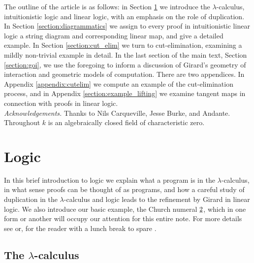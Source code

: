 \documentclass[english,letter paper,12pt,reqno]{article}
\theoremstyle{example}
\numberwithin{equation}{section}
\begin{document}
The outline of the article is as follows: in Section \ref{section:logic} we introduce the $\lambda$-calculus, intuitionistic logic and linear logic, with an emphasis on the role of duplication. In Section \ref{section:diagrammatics} we assign to every proof in intuitionistic linear logic a string diagram and corresponding linear map, and give a detailed example. In Section \ref{section:cut_elim} we turn to cut-elimination, examining a mildly non-trivial example in detail. In the last section of the main text, Section \ref{section:goi}, we use the foregoing to inform a discussion of Girard's geometry of interaction and geometric models of computation. There are two appendices. In Appendix \ref{appendix:cutelim} we compute an example of the cut-elimination process, and in Appendix \ref{section:example_lifting} we examine tangent maps in connection with proofs in linear logic. 
\\

\emph{Acknowledgements.} Thanks to Nils Carqueville, Jesse Burke, and Andante.
\\

Throughout $k$ is an algebraically closed field of characteristic zero.

\section{Logic}\label{section:logic}

In this brief introduction to logic we explain what a program is in the $\lambda$-calculus, in what sense proofs can be thought of as programs, and how a careful study of duplication in the $\lambda$-calculus and logic leads to the refinement by Girard in linear logic. We also introduce our basic example, the Church numeral $\underline{2}$, which in one form or another will occupy our attention for this entire note. For more details see \cite{girard_prooftypes,mellies} or, for the reader with a lunch break to spare \cite{scott_talk}.

\subsection{The $\lambda$-calculus}
\end{document}
